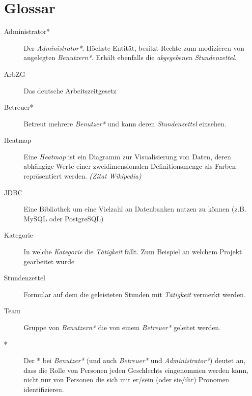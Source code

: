 \section{Glossar}
\begin{description}
	\item[Administrator*] Der \emph{Administrator*}. Höchste Entität, besitzt Rechte zum modizieren von angelegten \emph{Benutzern*}.
	               Erhält ebenfalls die \emph{abgegebenen Stundenzettel}.

	\item[ArbZG] Das deutsche Arbeitszeitgesetz

	\item[Betreuer*] Betreut mehrere \emph{Benutzer*} und kann deren \emph{Stundenzettel} einsehen.

	\item[Heatmap] Eine \emph{Heatmap} ist ein Diagramm zur Visualisierung von Daten, deren abhängige Werte einer zweidimensionalen Definitionsmenge als Farben repräsentiert werden.  \emph{(Zitat Wikipedia)}

	\item[JDBC] Eine Bibliothek um eine Vielzahl an Datenbanken nutzen zu können (z.B. MySQL oder PostgreSQL)

	\item[Kategorie] In welche \emph{Kategorie} die \emph{Tätigkeit} fällt. Zum Beispiel an welchem Projekt gearbeitet wurde

	\item[Stundenzettel] Formular auf dem die geleisteten Stunden mit \emph{Tätigkeit} vermerkt werden.

	\item[Team] Gruppe von \emph{Benutzern*} die von einem \emph{Betreuer*} geleitet werden.
	\item[*] Der * bei \emph{Benutzer*} (und auch \emph{Betreuer*} und \emph{Administrator*}) deutet an, dass die Rolle von Personen jeden Geschlechts eingenommen werden kann, nicht nur von Personen die sich mit er/sein (oder sie/ihr) Pronomen identifizieren.

\end{description}
